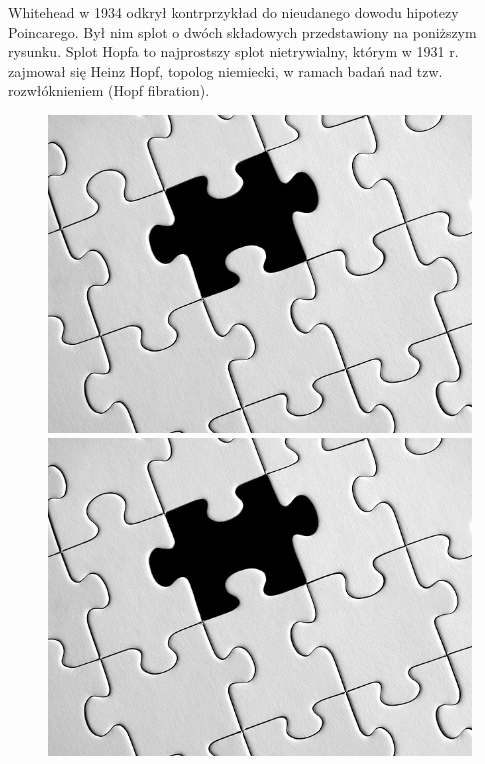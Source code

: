 \begin{example}
	Whitehead w 1934 odkrył kontrprzykład do nieudanego dowodu hipotezy Poincarego.
	Był nim splot o dwóch składowych przedstawiony na poniższym rysunku.
	Splot Hopfa to najprostszy splot nietrywialny, którym w 1931 r. zajmował się Heinz Hopf,
	topolog niemiecki, w ramach badań nad tzw. rozwłóknieniem (Hopf fibration).

	\begin{figure}[H]
		\begin{minipage}[b]{.32\linewidth}
			\centering
			\includegraphics[width=\linewidth]{../data/missing.jpg}
		\end{minipage}
		\begin{minipage}[b]{.32\linewidth}
			\centering
			\includegraphics[width=\linewidth]{../data/missing.jpg}

\end{minipage}
\end{figure}
\end{example}

